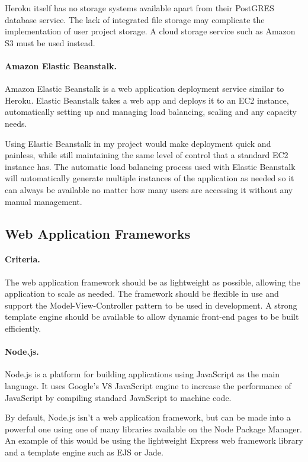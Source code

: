 Heroku itself has no storage systems available apart from their PostGRES database service. The lack of integrated file storage may complicate the implementation of user project storage. A cloud storage service such as Amazon S3 must be used instead.

\paragraph{Amazon Elastic Beanstalk.}
Amazon Elastic Beanstalk is a web application deployment service similar to Heroku. Elastic Beanstalk takes a web app and deploys it to an EC2 instance, automatically setting up and managing load balancing, scaling and any capacity needs.\cite{awselasticbeanstalk}

Using Elastic Beanstalk in my project would make deployment quick and painless, while still maintaining the same level of control that a standard EC2 instance has. The automatic load balancing process used with Elastic Beanstalk will automatically generate multiple instances of the application as needed so it can always be available no matter how many users are accessing it without any manual management.

\subsection{Web Application Frameworks}
\paragraph{Criteria.}
The web application framework should be as lightweight as possible, allowing the application to scale as needed. The framework should be flexible in use and support the Model-View-Controller pattern to be used in development. A strong template engine should be available to allow dynamic front-end pages to be built efficiently.

\paragraph{Node.js.}
Node.js is a platform for building applications using JavaScript as the main language. It uses Google's V8 JavaScript engine to increase the performance of JavaScript by compiling standard JavaScript to machine code.\cite{nodejs}

By default, Node.js isn't a web application framework, but can be made into a powerful one using one of many libraries available on the Node Package Manager.\cite{npmjs} An example of this would be using the lightweight Express web framework library and a template engine such as EJS or Jade.

